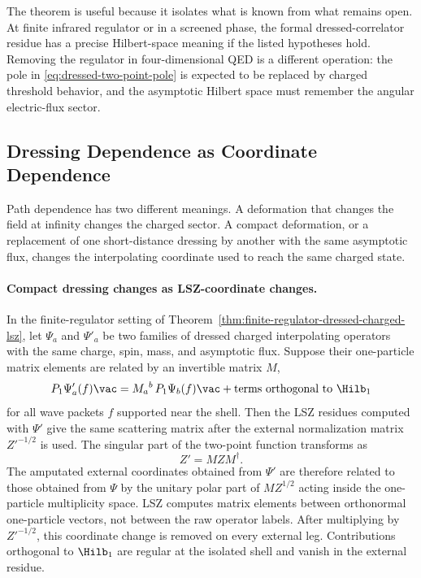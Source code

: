 The theorem is useful because it isolates what is known from what remains
open.  At finite infrared regulator or in a screened phase, the formal
dressed-correlator residue has a precise Hilbert-space meaning if the listed
hypotheses hold.  Removing the regulator in four-dimensional QED is a
different operation: the pole in \eqref{eq:dressed-two-point-pole} is expected
to be replaced by charged threshold behavior, and the asymptotic Hilbert space
must remember the angular electric-flux sector.

\subsection{Dressing Dependence as Coordinate Dependence}

Path dependence has two different meanings.  A deformation that changes the
field at infinity changes the charged sector.  A compact deformation, or a
replacement of one short-distance dressing by another with the same
asymptotic flux, changes the interpolating coordinate used to reach the same
charged state.

\paragraph{Compact dressing changes as LSZ-coordinate changes.}
In the finite-regulator setting of
Theorem~\ref{thm:finite-regulator-dressed-charged-lsz}, let
\(\Psi_a\) and \(\Psi'_a\) be two families of dressed charged interpolating
operators with the same charge, spin, mass, and asymptotic flux.  Suppose
their one-particle matrix elements are related by an invertible matrix \(M\),
\[
  P_1\Psi'_a(f)\vac
  =
  M_a{}^b\,P_1\Psi_b(f)\vac
  +\text{terms orthogonal to }\Hilb_1
\]
for all wave packets \(f\) supported near the shell.  Then the LSZ residues
computed with \(\Psi'\) give the same scattering matrix after the external
normalization matrix \(Z'^{-1/2}\) is used.
The singular part of the two-point function transforms as
\[
  Z' = M Z M^\dagger .
\]
The amputated external coordinates obtained from \(\Psi'\) are therefore
related to those obtained from \(\Psi\) by the unitary polar part of
\(MZ^{1/2}\) acting inside the one-particle multiplicity space.  LSZ computes
matrix elements between orthonormal one-particle vectors, not between the raw
operator labels.  After multiplying by \(Z'^{-1/2}\), this coordinate change
is removed on every external leg.  Contributions orthogonal to \(\Hilb_1\)
are regular at the isolated shell and vanish in the external residue.

